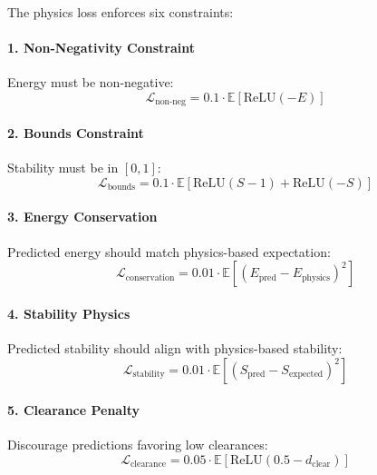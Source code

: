 The physics loss enforces six constraints:

\paragraph{1. Non-Negativity Constraint}
Energy must be non-negative:
\begin{equation}
\mathcal{L}_{\text{non-neg}} = 0.1 \cdot \mathbb{E}\left[ \text{ReLU}(-E) \right]
\label{eq:loss_nonneg}
\end{equation}

\paragraph{2. Bounds Constraint}
Stability must be in $[0, 1]$:
\begin{equation}
\mathcal{L}_{\text{bounds}} = 0.1 \cdot \mathbb{E}\left[ \text{ReLU}(S - 1) + \text{ReLU}(-S) \right]
\label{eq:loss_bounds}
\end{equation}

\paragraph{3. Energy Conservation}
Predicted energy should match physics-based expectation:
\begin{equation}
\mathcal{L}_{\text{conservation}} = 0.01 \cdot \mathbb{E}\left[ (E_{\text{pred}} - E_{\text{physics}})^2 \right]
\label{eq:loss_conservation}
\end{equation}

\paragraph{4. Stability Physics}
Predicted stability should align with physics-based stability:
\begin{equation}
\mathcal{L}_{\text{stability}} = 0.01 \cdot \mathbb{E}\left[ (S_{\text{pred}} - S_{\text{expected}})^2 \right]
\label{eq:loss_stability}
\end{equation}

\paragraph{5. Clearance Penalty}
Discourage predictions favoring low clearances:
\begin{equation}
\mathcal{L}_{\text{clearance}} = 0.05 \cdot \mathbb{E}\left[ \text{ReLU}(0.5 - d_{\text{clear}}) \right]
\label{eq:loss_clearance}
\end{equation}

